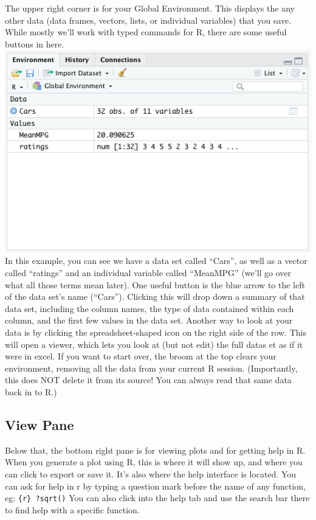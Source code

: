 \documentclass[
]{book}
\begin{document}
The upper right corner is for your Global Environment. This displays the any other data (data frames, vectors, lists, or individual variables) that you save. While mostly we'll work with typed commands for R, there are some useful buttons in here.
\includegraphics{images/Global Environment.png}
In this example, you can see we have a data set called ``Cars'', as well as a vector called ``ratings'' and an individual variable called ``MeanMPG'' (we'll go over what all those terms mean later). One useful button is the blue arrow to the left of the data set's name (``Cars''). Clicking this will drop down a summary of that data set, including the column names, the type of data contained within each column, and the first few values in the data set. Another way to look at your data is by clicking the spreadsheet-shaped icon on the right side of the row. This will open a viewer, which lets you look at (but not edit) the full datas et as if it were in excel. If you want to start over, the broom at the top clears your environment, removing all the data from your current R session. (Importantly, this does NOT delete it from its source! You can always read that same data back in to R.)

\hypertarget{view-pane}{%
\subsection{View Pane}\label{view-pane}}

Below that, the bottom right pane is for viewing plots and for getting help in R. When you generate a plot using R, this is where it will show up, and where you can click to export or save it. It's also where the help interface is located. You can ask for help in r by typing a question mark before the name of any function, eg: \texttt{\{r\}\ ?sqrt()}
You can also click into the help tab and use the search bar there to find help with a specific function.
\end{document}
